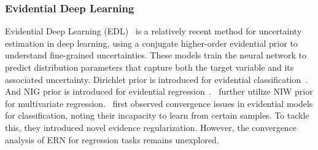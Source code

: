 \subsubsection{Evidential Deep Learning}
Evidential Deep Learning (EDL)~\cite{sensoy2018evidential,NEURIPS2020_aab08546,malinin2018predictive} is a relatively recent method for uncertainty estimation in deep learning, using a conjugate higher-order evidential prior to understand fine-grained uncertainties. These models train the neural network to predict distribution parameters that capture both the target variable and its associated uncertainty. Dirichlet prior is introduced for evidential classification~\cite{sensoy2018evidential}. And NIG prior is introduced for evidential regression~\cite{NEURIPS2020_aab08546}.~\citet{meinert2021multivariate} further utilize NIW prior for multivariate regression.~\citet{pandey2023learn} first observed convergence issues in evidential models for classification, noting their incapacity to learn from certain samples. To tackle this, they introduced novel evidence regularization. However, the convergence analysis of ERN for regression tasks remains unexplored.




